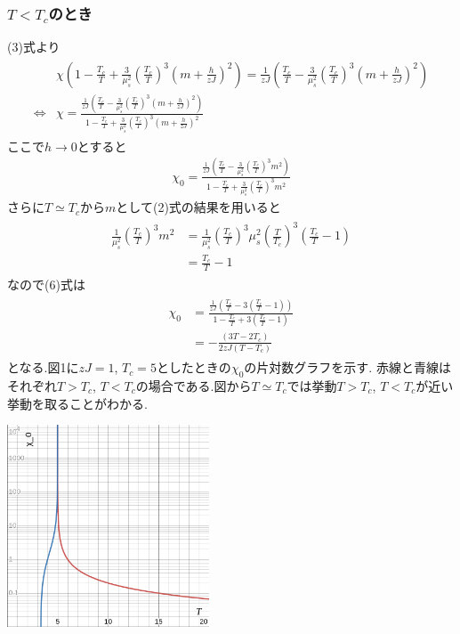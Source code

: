 \documentclass[uplatex,a4j,11pt,dvipdfmx]{jsarticle}
\makeatletter
\def\fgcaption{\def\@captype{figure}\caption}
\def\fgcaption{\def\@captype{figure}\caption}
\makeatother
\begin{document}
\subsubsection*{$T<T_c$のとき}
(3)式より
\begin{align}
  \begin{array}{cc}
    &\chi\left(1-\frac{T_c}{T}+\frac{3}{\mu_s^2}\left(\frac{T_c}{T}\right)^3\left(m+\frac{h}{zJ}\right)^2\right)=\frac{1}{zJ}\left(\frac{T_c}{T}-\frac{3}{\mu_s^2}\left(\frac{T_c}{T}\right)^3\left(m+\frac{h}{zJ}\right)^2\right)\\
    \iff&\chi=\frac{\frac{1}{zJ}\left(\frac{T_c}{T}-\frac{3}{\mu_s^2}\left(\frac{T_c}{T}\right)^3\left(m+\frac{h}{zJ}\right)^2\right)}{1-\frac{T_c}{T}+\frac{3}{\mu_s^2}\left(\frac{T_c}{T}\right)^3\left(m+\frac{h}{zJ}\right)^2}
  \end{array}
\end{align}
ここで$h\rightarrow0$とすると
\begin{align}
  \chi_0=\frac{\frac{1}{zJ}\left(\frac{T_c}{T}-\frac{3}{\mu_s^2}\left(\frac{T_c}{T}\right)^3m^2\right)}{1-\frac{T_c}{T}+\frac{3}{\mu_s^2}\left(\frac{T_c}{T}\right)^3m^2}
\end{align}
さらに$T\simeq T_c$から$m$として(2)式の結果を用いると
\begin{align}
  \begin{split}
    \frac{1}{\mu_s^2}\left(\frac{T_c}{T}\right)^3m^2&=\frac{1}{\mu_s^2}\left(\frac{T_c}{T}\right)^3\mu_s^2\left(\frac{T}{T_c}\right)^3\left(\frac{T_c}{T}-1\right)\\
    &=\frac{T_c}{T}-1
  \end{split}
\end{align}
なので(6)式は
\begin{align}
  \begin{split}
    \chi_0&=\frac{\frac{1}{zJ}\left(\frac{T_c}{T}-3\left(\frac{T_c}{T}-1\right)\right)}{1-\frac{T_c}{T}+3\left(\frac{T_c}{T}-1\right)}\\
    &=-\frac{(3T-2T_c)}{2zJ(T-T_c)}
  \end{split}
\end{align}
となる.図1に$zJ=1$, $T_c=5$としたときの$\chi_0$の片対数グラフを示す.
赤線と青線はそれぞれ$T>T_c$, $T<T_c$の場合である.図から$T\simeq T_c$では挙動$T>T_c$, $T<T_c$が近い挙動を取ることがわかる.
\begin{center}
  \includegraphics[width=6cm]{xi_0.png}
  \fgcaption{$zJ=1$, $T_c=5$としたときの$\xi_0$. 赤線は$T>T_c$, 青線は$T<T_c$の場合.}
\end{center}
\end{document}
